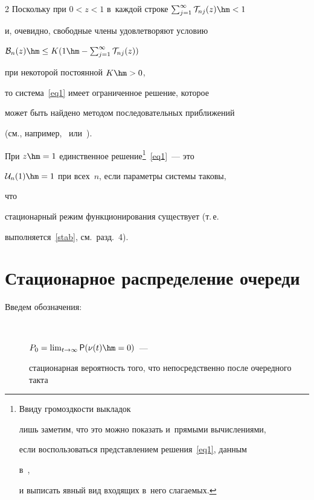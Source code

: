 \begin{multicols}{2}
Поскольку при $0<z<1$ в~каждой строке $\sum\nolimits_{j=1}^\infty 


\mathcal{T}_{nj}(z)\hm<1$


и, очевидно, свободные члены удовлетворяют условию


$\mathcal{B}_n(z) \hm\le K (1\hm-\sum\nolimits_{j=1}^\infty 


\mathcal{T}_{nj}(z))$


при некоторой постоянной $K\hm>0$,


то система~\eqref{eq1} имеет ограниченное решение, которое


может быть найдено методом последовательных приближений


(см., например,~\cite[теоремы~Ia,~IVa]{kry} или~\cite[теорема~1]{wil}).


При $z\hm=1$ единственное решение\footnote{Ввиду громоздкости выкладок 


лишь заметим, что это можно показать и~прямыми вычислениями,


если воспользоваться представлением решения~\eqref{eq1}, данным 


в~\cite[соотн.~(7)]{Car},


и выписать явный вид входящих в~него слагаемых.}~\eqref{eq1}~--- это 


$\mathcal{U}_{n}(1)\hm=1$ при всех~$n$, если параметры системы таковы, 


что


стационарный режим функционирования существует (т.\,е. 


выполняется~\eqref{stab}, см.\ разд.~4).








\section{Стационарное распределение очереди}





Введем обозначения:


\begin{description}


\item[\,]


$P_0=\lim\nolimits_{t \rightarrow \infty } {\sf P} (\nu(t)\hm=0)$~---


стационарная вероятность того, что непосредственно после очередного такта 



\end{description}
\end{multicols}
